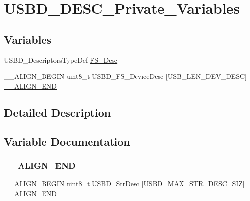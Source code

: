 \hypertarget{group__USBD__DESC__Private__Variables}{}\section{U\+S\+B\+D\+\_\+\+D\+E\+S\+C\+\_\+\+Private\+\_\+\+Variables}
\label{group__USBD__DESC__Private__Variables}
\subsection*{Variables}
\begin{DoxyCompactItemize}
\item 
U\+S\+B\+D\+\_\+\+Descriptors\+Type\+Def \hyperlink{group__USBD__DESC__Private__Variables_gae36d67393118d9d8531a8d633e23a797}{F\+S\+\_\+\+Desc}
\item 
\+\_\+\+\_\+\+A\+L\+I\+G\+N\+\_\+\+B\+E\+G\+IN uint8\+\_\+t U\+S\+B\+D\+\_\+\+F\+S\+\_\+\+Device\+Desc \mbox{[}U\+S\+B\+\_\+\+L\+E\+N\+\_\+\+D\+E\+V\+\_\+\+D\+E\+SC\mbox{]} \hyperlink{group__USBD__DESC__Private__Variables_ga89686ff64ce14e5466980830aea57e07}{\+\_\+\+\_\+\+A\+L\+I\+G\+N\+\_\+\+E\+ND}
\end{DoxyCompactItemize}


\subsection{Detailed Description}


\subsection{Variable Documentation}
\mbox{\label{group__USBD__DESC__Private__Variables_ga89686ff64ce14e5466980830aea57e07}} 
\subsubsection{\texorpdfstring{\+\_\+\+\_\+\+A\+L\+I\+G\+N\+\_\+\+E\+ND}{\_\_ALIGN\_END}}
{\footnotesize\ttfamily \+\_\+\+\_\+\+A\+L\+I\+G\+N\+\_\+\+B\+E\+G\+IN uint8\+\_\+t U\+S\+B\+D\+\_\+\+Str\+Desc \mbox{[}\hyperlink{group__USBD__CONF__Exported__Defines_ga056ff3fee04cffde6a1ccccd566f8682}{U\+S\+B\+D\+\_\+\+M\+A\+X\+\_\+\+S\+T\+R\+\_\+\+D\+E\+S\+C\+\_\+\+S\+IZ}\mbox{]} \+\_\+\+\_\+\+A\+L\+I\+G\+N\+\_\+\+E\+ND}

